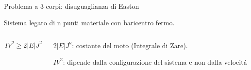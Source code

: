 \begin{frame}{Problema a 3 corpi: disuguaglianza di Easton}

Sistema legato di n punti materiale con baricentro fermo.

\begin{columns}[T]

\begin{column}{0.5\textwidth}
\begin{equation*}
IV^2\geq2|E|J^2
\end{equation*}
\end{column}

\begin{column}{0.5\textwidth}
$2|E|J^2$: costante del moto (Integrale di Zare).

$IV^2$: dipende dalla configurazione del sistema e non dalla velocit\'a

\end{column}

\end{columns}


\end{frame}
